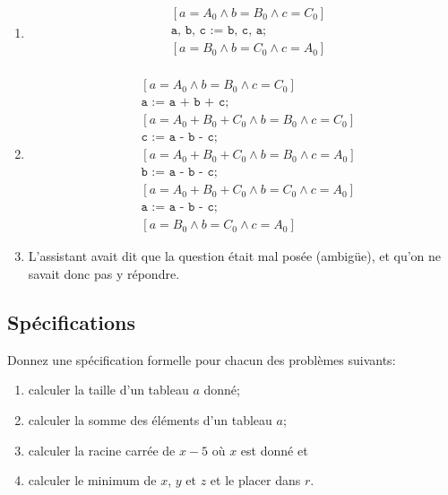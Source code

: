 \begin{solution}
\begin{enumerate}[label={\textbf{\alph*.}}]
	\item
	\begin{align*}
	&[a = A_0 \land b = B_0 \land c = C_0] \\
	&\texttt{a, b, c := b, c, a;} \\
	&[a = B_0 \land b = C_0 \land c = A_0] \\
	\end{align*}
	\item
	\begin{align*}
		&[a = A_0 \land b = B_0 \land c = C_0] \\
		&\texttt{a := a + b + c;} \\
		&[a = A_0 + B_0 + C_0 \land b = B_0 \land c = C_0] \\
		&\texttt{c := a - b - c;} \\
		&[a = A_0 + B_0 + C_0 \land b = B_0 \land c = A_0] \\
		&\texttt{b := a - b - c;} \\
		&[a = A_0 + B_0 + C_0 \land b = C_0 \land c = A_0] \\
		&\texttt{a := a - b - c;} \\
		&[a = B_0 \land b = C_0 \land c = A_0]
	\end{align*}
	\item L'assistant avait dit que la question était mal posée (ambigüe),
	et qu'on ne savait donc pas y répondre.
\end{enumerate}
\end{solution}

\subsection{Spécifications}
Donnez une spécification formelle pour chacun des problèmes suivants:
\begin{enumerate}[label={\textbf{\alph*.}}]
	\item calculer la taille d'un tableau $a$ donné;
	\item calculer la somme des éléments d'un tableau $a$;
	\item calculer la racine carrée de $x-5$ où $x$ est donné et
	\item calculer le minimum de $x$, $y$ et $z$ et le placer dans $r$.
\end{enumerate}

